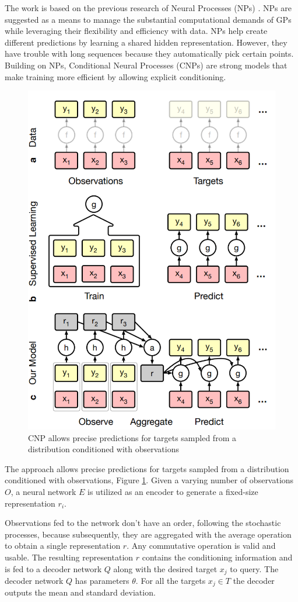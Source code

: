 The work is based on the previous research of Neural Processes (NPs) \cite{garnelo2018neural}. NPs are suggested as a means to manage the substantial computational demands of GPs while leveraging their flexibility and efficiency with data. NPs help create different predictions by learning a shared hidden representation. However, they have trouble with long sequences because they automatically pick certain points. Building on NPs, Conditional Neural Processes (CNPs) are strong models that make training more efficient by allowing explicit conditioning.
\begin{figure}
	\centering
	\includegraphics[width=0.5\linewidth]{Images/CNPdata.png}
	\caption{CNP allows precise predictions for targets sampled from a distribution conditioned with observations}
	\label{fig:cnp_data}
\end{figure}
The approach allows precise predictions for targets sampled from a distribution conditioned with observations, Figure \ref{fig:cnp_data}. Given a varying number of observations $O$, a neural network $E$ is utilized as an encoder to generate a fixed-size representation $r_i$.

Observations fed to the network don't have an order, following the stochastic processes, because subsequently, they are aggregated with the average operation to obtain a single representation $r$. Any commutative operation is valid and usable. The resulting representation $r$ contains the conditioning information and is fed to a decoder network $Q$ along with the desired target $x_j$ to query. The decoder network $Q$ has parameters $\theta$. For all the targets $x_j \in T$ the decoder outputs the mean and standard deviation.

